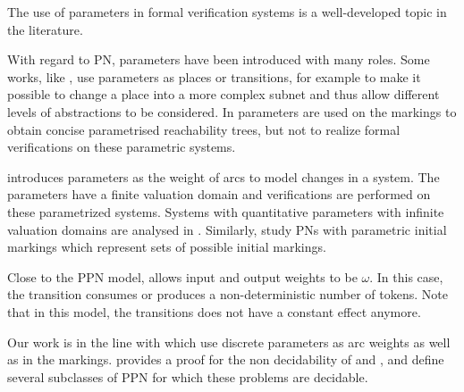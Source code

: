 The use of parameters in formal verification systems is a well-developed topic in the literature.

With regard to \ac{PN}, parameters have been introduced with many roles.
Some works, like \cite{Christensen97}, use parameters as places or transitions, for example to make it possible to change a place into a more complex subnet and thus allow different levels of abstractions to be considered.
In \cite{Lindqvist91} parameters are used on the markings to obtain concise parametrised reachability trees, but not to realize formal verifications on these parametric systems.

\cite{Badouel99} introduces parameters as the weight of arcs to model changes in a system.
The parameters have a finite valuation domain and verifications are performed on these parametrized systems.
Systems with quantitative parameters with infinite valuation domains are analysed in \cite{Abdulla13}.
Similarly, \cite{Marsan94} study \acp{PN} with parametric initial markings which represent sets of possible initial markings.

Close to the \ac{PPN} model, \opn \citep{Geeraerts15} allows input and output weights to be $\omega$. In this case, the transition consumes or produces a non-deterministic number of tokens. Note that in this model, the transitions does not have a constant effect anymore.

Our work is in the line with \cite{David17} which use discrete parameters as arc weights as well as in the markings.
\cite{David17} provides a proof for the non decidability of \Ucov and \Ecov, and define several subclasses of \ac{PPN} for which these problems are decidable.


